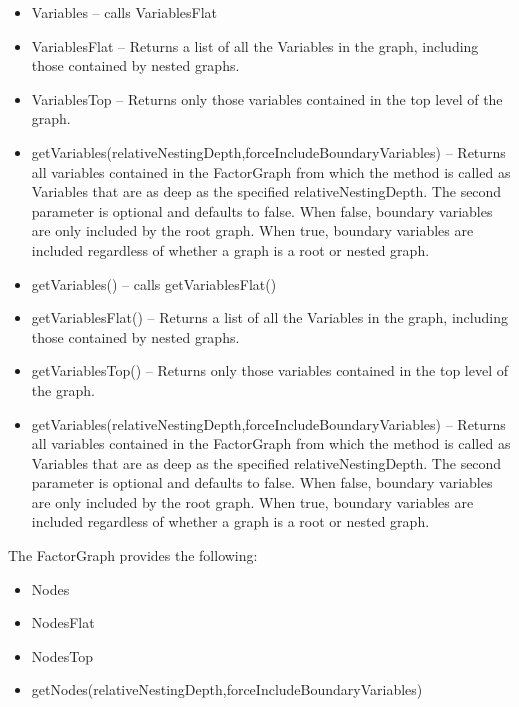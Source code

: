 \ifmatlab
\begin{itemize}
\item Variables -- calls VariablesFlat
\item VariablesFlat -- Returns a list of all the Variables in the graph, including those contained by nested graphs.
\item VariablesTop -- Returns only those variables contained in the top level of the graph.
\item getVariables(relativeNestingDepth,forceIncludeBoundaryVariables) -- Returns all variables contained in the FactorGraph from which the method is called as Variables that are as deep as the specified relativeNestingDepth.  The second parameter is optional and defaults to false.  When false, boundary variables are only included by the root graph.  When true, boundary variables are included regardless of whether a graph is a root or nested graph.
\end{itemize}
\fi

\ifjava
\begin{itemize}
\item getVariables() -- calls getVariablesFlat()
\item getVariablesFlat() -- Returns a list of all the Variables in the graph, including those contained by nested graphs.
\item getVariablesTop() -- Returns only those variables contained in the top level of the graph.
\item getVariables(relativeNestingDepth,forceIncludeBoundaryVariables) -- Returns all variables contained in the FactorGraph from which the method is called as Variables that are as deep as the specified relativeNestingDepth.  The second parameter is optional and defaults to false.  When false, boundary variables are only included by the root graph.  When true, boundary variables are included regardless of whether a graph is a root or nested graph.
\end{itemize}
\fi



The FactorGraph provides the following:

\ifmatlab
\begin{itemize}
\item Nodes
\item NodesFlat
\item NodesTop
\item getNodes(relativeNestingDepth,forceIncludeBoundaryVariables)
\end{itemize}
\fi

